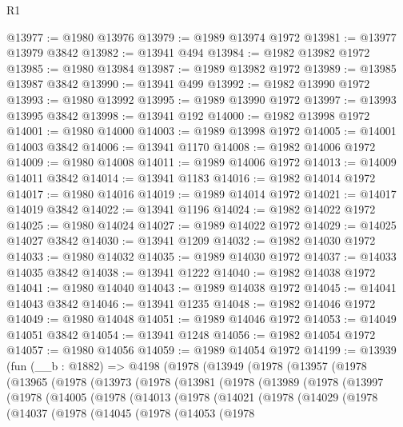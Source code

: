 \begin{lexlean}{R1}
\begin{coremodule}
@13977 := @1980 @13976
@13979 := @1989 @13974 @1972
@13981 := @13977 @13979 @3842
@13982 := @13941 @494
@13984 := @1982 @13982 @1972
@13985 := @1980 @13984
@13987 := @1989 @13982 @1972
@13989 := @13985 @13987 @3842
@13990 := @13941 @499
@13992 := @1982 @13990 @1972
@13993 := @1980 @13992
@13995 := @1989 @13990 @1972
@13997 := @13993 @13995 @3842
@13998 := @13941 @192
@14000 := @1982 @13998 @1972
@14001 := @1980 @14000
@14003 := @1989 @13998 @1972
@14005 := @14001 @14003 @3842
@14006 := @13941 @1170
@14008 := @1982 @14006 @1972
@14009 := @1980 @14008
@14011 := @1989 @14006 @1972
@14013 := @14009 @14011 @3842
@14014 := @13941 @1183
@14016 := @1982 @14014 @1972
@14017 := @1980 @14016
@14019 := @1989 @14014 @1972
@14021 := @14017 @14019 @3842
@14022 := @13941 @1196
@14024 := @1982 @14022 @1972
@14025 := @1980 @14024
@14027 := @1989 @14022 @1972
@14029 := @14025 @14027 @3842
@14030 := @13941 @1209
@14032 := @1982 @14030 @1972
@14033 := @1980 @14032
@14035 := @1989 @14030 @1972
@14037 := @14033 @14035 @3842
@14038 := @13941 @1222
@14040 := @1982 @14038 @1972
@14041 := @1980 @14040
@14043 := @1989 @14038 @1972
@14045 := @14041 @14043 @3842
@14046 := @13941 @1235
@14048 := @1982 @14046 @1972
@14049 := @1980 @14048
@14051 := @1989 @14046 @1972
@14053 := @14049 @14051 @3842
@14054 := @13941 @1248
@14056 := @1982 @14054 @1972
@14057 := @1980 @14056
@14059 := @1989 @14054 @1972
@14199 := @13939
    (fun (__b : @1882) =>
    @4198
      (@1978
        (@13949
          (@1978
            (@13957
              (@1978
                (@13965
                  (@1978
                    (@13973
                      (@1978
                        (@13981
                          (@1978
                            (@13989
                              (@1978
                                (@13997
                                  (@1978
                                    (@14005
                                      (@1978
                                        (@14013
                                          (@1978
                                            (@14021
                                              (@1978
                                                (@14029
                                                  (@1978
                                                    (@14037
                                                      (@1978
                                                        (@14045
                                                          (@1978
                                                            (@14053
                                                              (@1978

\end{coremodule}
\end{lexlean}
